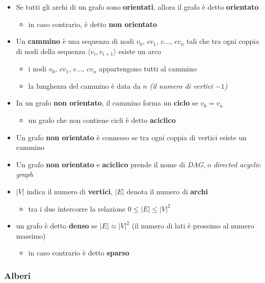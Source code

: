 \documentclass[italian, 10pt]{article}
\begin{document}
\begin{itemize}
  \item Se tutti gli archi di un grafo sono \textbf{orientati}, allora il grafo è detto \textbf{orientato}
        \begin{itemize}
          \item in caso contrario, è detto \textbf{non orientato}
        \end{itemize}
  \item Un \textbf{cammino} è una sequenza di nodi \(v_0,\,c v_1,\,c \ldots,\,c v_n\) tali che tra ogni coppia di nodi della sequenza \(\langle v_i, v_{i+1} \rangle\) esiste un arco
        \begin{itemize}
          \item i nodi \(v_0,\,c v_1,\,c \ldots,\,c v_n\) appartengono tutti al cammino
          \item la lunghezza del cammino è data da \(n\) \textit{(il numero di vertici \(-1\))}
        \end{itemize}
  \item In un grafo \textbf{non orientato}, il cammino forma un \textbf{ciclo} se \(v_0 = v_n\)
        \begin{itemize}
          \item un grafo che non contiene cicli è detto \textbf{aciclico}
        \end{itemize}
  \item Un grafo \textbf{non orientato} è connesso se tra ogni coppia di vertici esiste un cammino
  \item Un grafo \textbf{non orientato} e \textbf{aciclico} prende il nome di \textit{DAG}, o \textit{directed acyclic graph}
  \item \(|V|\) indica il numero di \textbf{vertici}, \(|E|\) denota il numero di \textbf{archi}
        \begin{itemize}
          \item tra i due intercorre la relazione \(0 \leq |E| \leq |V|^2\)
        \end{itemize}
  \item un grafo è detto \textbf{denso} se \(|E| \approx |V|^2\) (il numero di lati è prossimo al numero massimo)
        \begin{itemize}
          \item in caso contrario è detto \textbf{sparso}
        \end{itemize}
\end{itemize}

\subsubsection{Alberi}
\label{sec:alberi}
\end{document}
